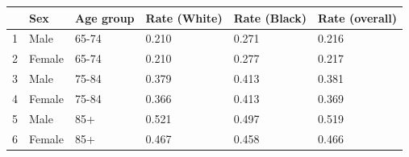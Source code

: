 \begin{table}[ht]
\centering
\begin{tabular}{rlllll}
  \hline
 & Sex & Age group & Rate (White) & Rate (Black) & Rate (overall) \\ 
  \hline
1 & Male & 65-74 & 0.210 & 0.271 & 0.216 \\ 
  2 & Female & 65-74 & 0.210 & 0.277 & 0.217 \\ 
  3 & Male & 75-84 & 0.379 & 0.413 & 0.381 \\ 
  4 & Female & 75-84 & 0.366 & 0.413 & 0.369 \\ 
  5 & Male & 85+ & 0.521 & 0.497 & 0.519 \\ 
  6 & Female & 85+ & 0.467 & 0.458 & 0.466 \\ 
   \hline
\end{tabular}
\end{table}

